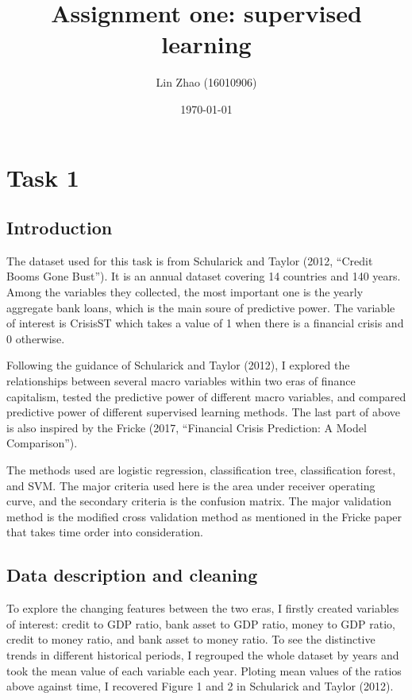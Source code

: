 \documentclass{article}
\begin{document}
\title{Assignment one: supervised learning}
\author{Lin Zhao (16010906)}
\date{\today}
\maketitle

\newpage

\section*{Task 1}

\subsection*{Introduction}

The dataset used for this task is from Schularick and Taylor (2012,
``Credit Booms Gone Bust''). It is an annual dataset covering 14
countries and 140 years. Among the variables they collected, the most
important one is the yearly aggregate bank loans, which is
the main soure of predictive power. The variable of interest is
CrisisST which takes a value of 1 when there is a financial crisis and 0
otherwise.

Following the guidance of Schularick and Taylor (2012), I explored the
relationships between several macro variables within two
eras of finance capitalism, tested the predictive power of different
macro variables, and compared predictive power of different supervised
learning methods. The last part of above is also inspired by the
Fricke (2017, ``Financial Crisis Prediction: A Model Comparison'').

The methods used are logistic regression, classification
tree, classification forest, and SVM. The major criteria
used here is the area under receiver operating curve, and the secondary criteria
is the confusion matrix. The major validation method is the modified cross
validation method  as mentioned in the Fricke paper that takes time order into
consideration.

\subsection*{Data description and cleaning}

To explore the changing features between the two eras, I firstly created
variables of interest: credit to GDP ratio, bank asset to GDP ratio,
money to GDP ratio, credit to money ratio, and bank asset to money
ratio. To see the distinctive trends in different historical periods, I
regrouped the whole dataset by years and took the mean value of each variable
each year. Ploting mean values of the ratios above against time, I
recovered Figure 1 and 2 in Schularick and Taylor (2012).
\end{document}
